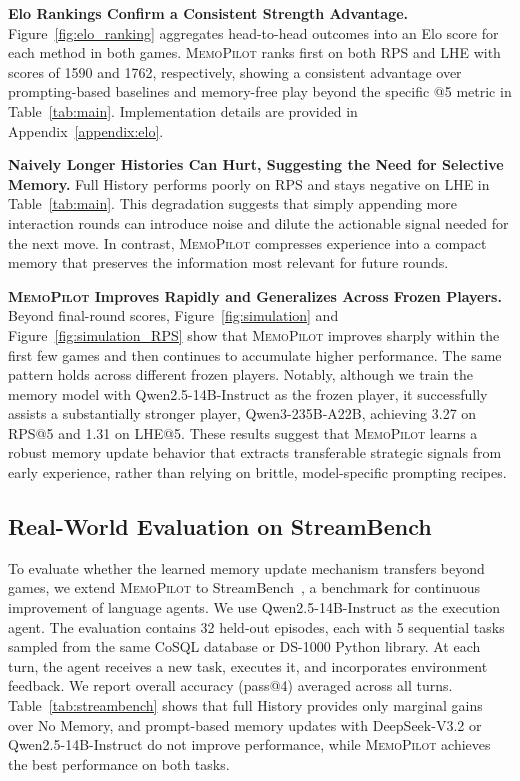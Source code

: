 \documentclass{article}
\newcommand{\methodname}{MemoPilot}
\newcommand{\method}{\textsc{\methodname}}
\theoremstyle{plain}
\theoremstyle{definition}
\theoremstyle{remark}
\begin{document}
 \textbf{Elo Rankings Confirm a Consistent Strength Advantage.}
 Figure~\ref{fig:elo_ranking} aggregates head-to-head outcomes into an Elo score for each method in both games. \method{} ranks first on both RPS and LHE with scores of 1590 and 1762, respectively, showing a consistent advantage over prompting-based baselines and memory-free play beyond the specific @5 metric in Table~\ref{tab:main}. Implementation details are provided in Appendix~\ref{appendix:elo}.

\textbf{Naively Longer Histories Can Hurt, Suggesting the Need for Selective Memory.}
Full History performs poorly on RPS and stays negative on LHE in Table~\ref{tab:main}. This degradation suggests that simply appending more interaction rounds can introduce noise and dilute the actionable signal needed for the next move. In contrast, \method{} compresses experience into a compact memory that preserves the information most relevant for future rounds.

\textbf{\method{} Improves Rapidly and Generalizes Across Frozen Players.}
Beyond final-round scores, Figure~\ref{fig:simulation} and Figure~\ref{fig:simulation_RPS} show that \method{} improves sharply within the first few games and then continues to accumulate higher performance. The same pattern holds across different frozen players. Notably, although we train the memory model with Qwen2.5-14B-Instruct as the frozen player, it successfully assists a substantially stronger player, Qwen3-235B-A22B, achieving 3.27 on RPS@5 and 1.31 on LHE@5. These results suggest that \method{} learns a robust memory update behavior that extracts transferable strategic signals from early experience, rather than relying on brittle, model-specific prompting recipes.

\subsection{Real-World Evaluation on StreamBench}

To evaluate whether the learned memory update mechanism transfers beyond games, we extend \method{} to StreamBench~\citep{wu2024streambench}, a benchmark for continuous improvement of language agents. We use Qwen2.5-14B-Instruct as the execution agent. The evaluation contains 32 held-out episodes, each with 5 sequential tasks sampled from the same CoSQL database or DS-1000 Python library. At each turn, the agent receives a new task, executes it, and incorporates environment feedback. We report overall accuracy (pass@4) averaged across all turns. Table~\ref{tab:streambench} shows that full History provides only marginal gains over No Memory, and prompt-based memory updates with DeepSeek-V3.2 or Qwen2.5-14B-Instruct do not improve performance, while \method{} achieves the best performance on both tasks.
\end{document}
